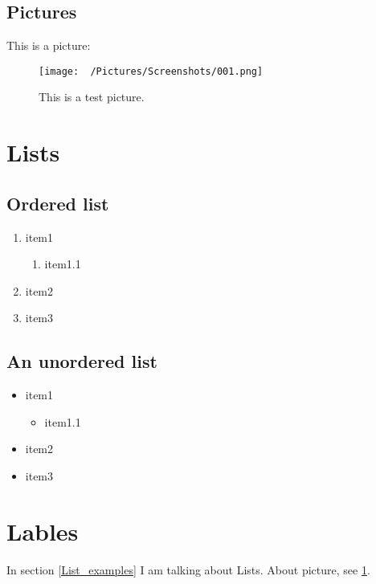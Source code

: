 
\subsection{Pictures}
This is a picture:
\begin{figure}[!hbtp]
    \begin{center}
    \texttt{[image: ~/Pictures/Screenshots/001.png]}
    \end{center}
    \caption{This is a test picture.\label{Picture_example}}
\end{figure}


\section{Lists\label{List_examples}}

\subsection{Ordered list}
\begin{enumerate}
    \item item1
        \begin{enumerate}
            \item item1.1
        \end{enumerate}
    \item item2
    \item item3
\end{enumerate}

\subsection{An unordered list}
\begin{itemize}
    \item item1
        \begin{itemize}
            \item item1.1
        \end{itemize}
    \item item2
    \item item3
\end{itemize}

\section{Lables}
In section \ref{List_examples} I am talking about Lists.
About picture, see \ref{Picture_example}.

